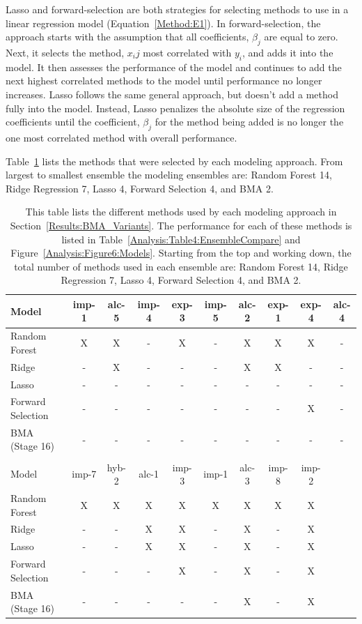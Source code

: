 \documentclass[journal=jpcbfk, manuscript=article]{achemso}
\newcommand{\+}[1]{\ensuremath{\mathbf{#1}}}
\newcommand{\rev}[1]{#1}
\begin{document}
\rev{Lasso and forward-selection are both strategies for selecting methods to use in a linear regression model (Equation~\ref{Method:E1}). 
In forward-selection, the approach starts with the assumption that all coefficients, $\beta_j$ are equal to zero.
Next, it selects the method, $x_ij$ most correlated with $y_i$, and adds it into the model. 
It then assesses the performance of the model and continues to add the next highest correlated methods to the model until performance no longer increases.
Lasso follows the same general approach, but doesn't add a method fully into the model.
Instead, Lasso penalizes the absolute size of the regression coefficients until the coefficient, $\beta_j$ for the method being added is no longer the one most correlated method with overall performance.}

\rev{Table~\ref{Analysis:Table5:EnsembleVariables} lists the methods that were selected by each modeling approach. From largest to smallest ensemble the modeling ensembles are: Random Forest 14, Ridge Regression 7, Lasso 4, Forward Selection 4, and BMA 2.}

\begin{table}[t!]
	\centering
	\caption[Methods used by each modeling approach]{\rev{This table lists the different methods used by each modeling approach in Section~\ref{Results:BMA_Variants}.  The performance for each of these methods is listed in Table~\ref{Analysis:Table4:EnsembleCompare} and Figure~\ref{Analysis:Figure6:Models}. Starting from the top and working down, the total number of methods used in each ensemble are: Random Forest 14, Ridge Regression 7, Lasso 4, Forward Selection 4, and BMA 2.}}
	\footnotesize
	\rev{
	\begin{tabular}{lccccccccc}
		\hline
		\hline
		Model  & imp-1 & alc-5 & imp-4 & exp-3 & imp-5 & alc-2 & exp-1 & exp-4 & alc-4\\
		\hline
		Random Forest & X & X & - & X & - & X & X & X & -\\
		Ridge & - & X & - & - & - & X & X & - & -\\
		Lasso & - & - & - & - & - & - & - & - & -\\
		Forward Selection & - & - & - & - & - & - & - & X & -\\
		BMA (Stage 16) & - & - & - & - & - & - & - & - & -\\		
		\hline
		\\
		\hline
		Model & imp-7 & hyb-2 & alc-1 & imp-3 & imp-1 & alc-3 & imp-8 & imp-2 &\\
		\hline
		Random Forest & X & X & X & X & X & X & X & X &\\
		Ridge & - & - & X & X & - & X & - & X &\\
		Lasso & - & - & X & X & - & X & - & X &\\
		Forward Selection & - & - & - & X & - & X & - & X &\\
		BMA (Stage 16) & - & - & - & - & - & X & - & X &\\		
		\hline
		\hline
	\end{tabular}}
	\label{Analysis:Table5:EnsembleVariables}
\end{table}
\end{document}
